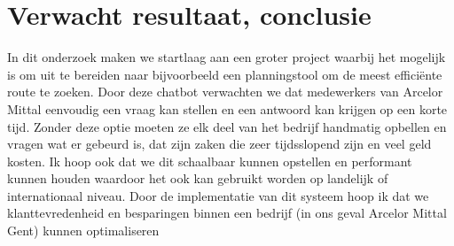




\section{Verwacht resultaat, conclusie}%
\label{sec:verwachte_resultaten}
In dit onderzoek maken we startlaag aan een groter project waarbij het mogelijk is om uit te bereiden naar bijvoorbeeld een planningstool om de meest efficiënte route te zoeken.
Door deze chatbot verwachten we dat medewerkers van Arcelor Mittal eenvoudig een vraag kan stellen en een antwoord kan krijgen op een korte tijd.
Zonder deze optie moeten ze elk deel van het bedrijf handmatig opbellen en vragen wat er gebeurd is, dat zijn zaken die zeer tijdsslopend zijn en veel geld kosten.
Ik hoop ook dat we dit schaalbaar kunnen opstellen en performant kunnen houden waardoor het ook kan gebruikt worden op landelijk of internationaal niveau.
Door de implementatie van dit systeem hoop ik dat we klanttevredenheid en besparingen binnen een bedrijf (in ons geval Arcelor Mittal Gent) kunnen optimaliseren


